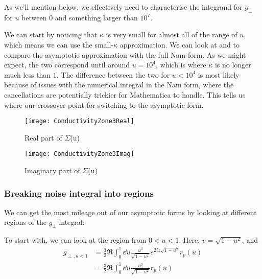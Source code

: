 \documentclass[../main.tex]{subfiles}
\begin{document}
	As we'll mention below, we effectively need to characterise the integrand for $g_\perp$ for $u$ between $0$ and something larger than $10^7$.

	We can start by noticing that $\kappa$ is very small for almost all of the range of $u$, which means we can use the small-$\kappa$ approximation.
	We can look at  and  to compare the asymptotic approximation with the full Nam form.
	As we might expect, the two correspond until around $u = 10^4$, which is where $\kappa$ is no longer much less than $1$.
	The difference between the two for $u < 10^4$ is most likely because of issues with the numerical integral in the Nam form, where the cancellations are potentially trickier for Mathematica to handle.
	This tells us where our crossover point for switching to the asymptotic form.

	\begin{figure}[htp]
		\centering
		\texttt{[image: ConductivityZone3Real]}
		\caption{Real part of $\Sigma$(u)} \label{fig:ConductivityRe}
	\end{figure}

	\begin{figure}[htp]
		\centering
		\texttt{[image: ConductivityZone3Imag]}
		\caption{Imaginary part of $\Sigma$(u)} \label{fig:ConductivityIm}
	\end{figure}

	\subsubsection{Breaking noise integral into regions} \label{subsubsec:noiseregions}
	We can get the most mileage out of our asymptotic forms by looking at different regions of the $g_\perp$ integral:

	To start with, we can look at the region from $0 < u < 1$.
	Here, $v = \sqrt{1 - u^2}$, and
	\begin{align}
		g_{\perp, u < 1} &= \frac32 \Re \int_0^{1} \dd{u} \frac{u^3}{\sqrt{1 - u^2}} e^{2 i z \sqrt{1 - u^2}} r_p(u) \\
			&= \frac32 \Re \int_0^{1} \dd{u} \frac{u^3}{\sqrt{1 - u^2}} r_p(u)
	\end{align}
\end{document}
